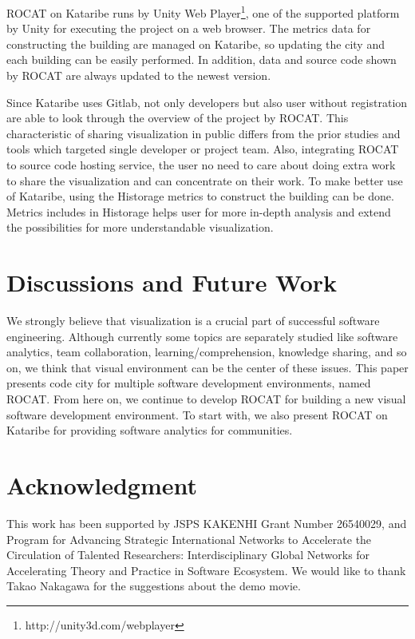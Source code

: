 \documentclass[conference]{IEEEtran}
\begin{document}
ROCAT on Kataribe runs by Unity Web Player\footnote{http://unity3d.com/webplayer}, one of the supported platform by Unity for executing the project on a web browser.
The metrics data for constructing the building are managed on Kataribe, so updating the city and each building can be easily performed.
In addition, data and source code shown by ROCAT are always updated to the newest version.

Since Kataribe uses Gitlab, not only developers but also user without registration are able to look through the overview of the project by ROCAT.
This characteristic of sharing visualization in public differs from the prior studies and tools which targeted single developer or project team.
Also, integrating ROCAT to source code hosting service, the user no need to care about doing extra work to share the visualization and can concentrate on their work.
To make better use of Kataribe, using the Historage metrics to construct the building can be done.
Metrics includes in Historage helps user for more in-depth analysis and extend the possibilities for more understandable visualization.


\section{Discussions and Future Work}
We strongly believe that visualization is a crucial part of successful software engineering.
Although currently some topics are separately studied like software analytics, team collaboration, learning/comprehension, knowledge sharing, and so on, we think that visual environment can be the center of these issues.
This paper presents code city for multiple software development environments, named ROCAT.
From here on, we continue to develop ROCAT for building a new visual software development environment.
To start with, we also present ROCAT on Kataribe for providing software analytics for communities.

\section*{Acknowledgment}
This work has been supported by JSPS KAKENHI Grant Number 26540029, and Program for Advancing Strategic International Networks to Accelerate the Circulation of Talented Researchers: Interdisciplinary Global Networks for Accelerating Theory and Practice in Software Ecosystem.
We would like to thank Takao Nakagawa for the suggestions about the demo movie.
\end{document}
